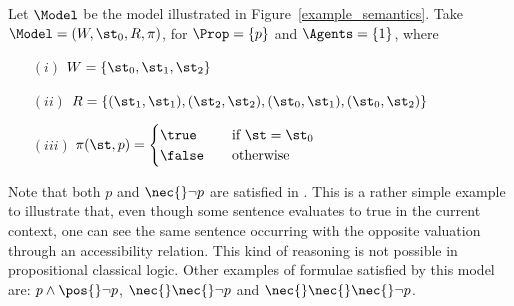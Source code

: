 \begin{example}
    Let $\Model$ be the model illustrated in Figure~\ref{example_semantics}. Take
    $\Model = (W, \st_0, R, \pi)$, for $\Prop = \{p\}$ and $\Agents = \{1\}$,
    where 
    \begin{enumerate}
        \item[$(i)$] $W = \{\st_0, \st_1, \st_2\}$
        \item[$(ii)$] $R = \{(\st_1, \st_1), (\st_2, \st_2),
            (\st_0, \st_1), (\st_0, \st_2)\}$
        \item[$(iii)$] $ \pi(\st, p) = 
            \begin{cases} 
                \true    & \quad \text{if } \st = \st_0\\
                \false   & \quad \text{otherwise}
            \end{cases}
                       $
    \end{enumerate}

    Note that both $p$ and $\nec{} \neg p$ are satisfied in \Model. This is a
    rather simple example to illustrate that, even though some sentence
    evaluates to true in the current context, one can see the same sentence
    occurring with the opposite valuation through an accessibility relation.
    This kind of reasoning is not possible in propositional classical logic.
    Other examples of formulae satisfied by this model are: $p \land \pos{} \neg
    p$, $\nec{}\nec{} \neg p$ and $\nec{} \nec {} \nec{} \neg p$.
\end{example}



